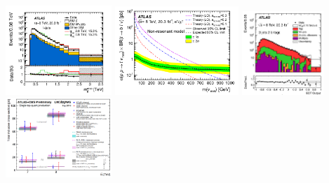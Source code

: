 \begin{frame}
\begin{center}
\hspace*{-1cm}
\includegraphics[width=0.3\textwidth]{Figures/FourTops/fig_resonancettbar.png}
\hspace*{-0.2cm}
\includegraphics[width=0.35\textwidth]{Figures/FourTops/fig_monotop.png}%
\hspace*{-0.15cm}
\includegraphics[width=0.23\textwidth]{Figures/FourTops/fig_Wprime.png}
\hspace*{-0.1cm}
\includegraphics[width=0.3\textwidth]{Figures/FourTops/singletop_summaryplot.png}
\end{center}


\end{frame}
